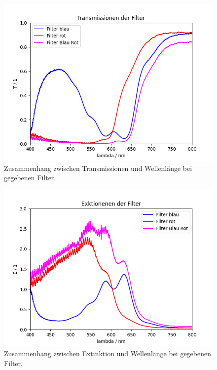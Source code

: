 \documentclass{article}
\begin{document}
\begin{figure}[H]
\centering
\caption{Zusammenhang zwischen Transmissionen und Wellenlänge bei gegebenen Filter.}
\label{fig:T_Farben}
\includegraphics[scale=0.6]{FF_Transmissionen.png}
\end{figure}



\begin{figure}[H]
\centering
\caption{Zusammenhang zwischen Extinktion und Wellenlänge bei gegebenen Filter.}
\label{fig:Ext}
\includegraphics[scale=0.6]{FF_Extinktionen.png}
\end{figure}
\end{document}
